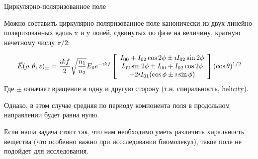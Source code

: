 \documentclass[9pt, compress, xcolor=table]{beamer}
\begin{document}
\begin{frame}{Циркулярно-поляризованное поле}
    
Можно составить циркулярно-поляризованное поле канонически из двух линейно-поляризованных вдоль x и y
полей, сдвинутых по фазе на величину, кратную нечетному числу $\pi/2$:

\begin{equation*}
\begin{gathered}
\vec E(\rho, \theta, z)_{\pm} = \frac{\imath k f}{2} \sqrt {\frac{n_1}{n_2}}E_0 e^{-\imath k f}
\left[\array{c} I_{00} + I_{02}\cos 2 \phi \pm \imath I_{02} \sin 2 \phi\\ I_{02} \sin 2 \phi \pm I_{00} + I_{02}\cos 2 \phi\\ -2 \imath I_{01}(\cos \phi\pm\imath \sin\phi)
\endarray\right] (\cos \theta)^{1/2}
\end{gathered}
\end{equation*}
Где $\pm$ означает вращение в одну и другую сторону (т.н. спиральность, helicity).

\textcolor{red!50!black}{Однако}, в этом случае средняя по периоду компонента поля в продольном направлении будет равна нулю.

Если наша задача стоит так, что нам необходимо уметь различить хиральность вещества (что особенно важно при иссследовании биомолекул), такое поле не подойдет для исследования.
    
\end{frame}
\end{document}
